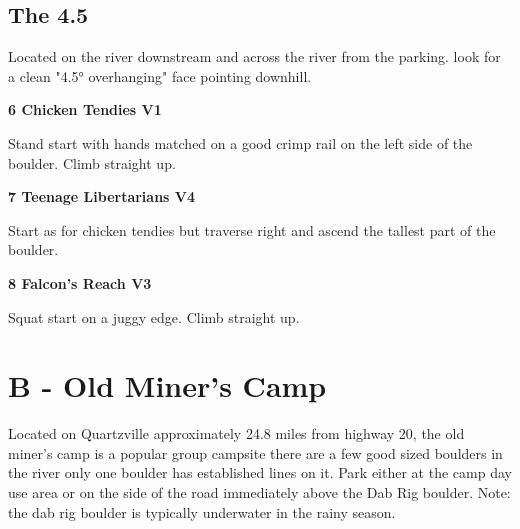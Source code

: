	\begin{multicols}{2}


\needspace{1.5cm}
\subsection*{The 4.5}\label{bf:The 4.5}
Located on the river downstream and across the river from the parking. look for a clean "4.5° overhanging" face pointing downhill.\\
	


\needspace{1.5cm}
\label{rt:Chicken Tendies}
\colorbox{green!20}{
\parbox{0.95\linewidth}{
\textbf{
6 Chicken Tendies V1  
}}}

\begin{adjustwidth}{0.5cm}{}			
Stand start with hands matched on a good crimp rail on the left side of the boulder. Climb straight up.
\end{adjustwidth}



\needspace{1.5cm}
\label{rt:Teenage Libertarians}
\colorbox{RoyalBlue!20}{
\parbox{0.95\linewidth}{
\textbf{
7 Teenage Libertarians V4  
}}}

\begin{adjustwidth}{0.5cm}{}			
Start as for chicken tendies but traverse right and ascend the tallest part of the boulder.
\end{adjustwidth}



\needspace{1.5cm}
\label{rt:Falcon's Reach}
\colorbox{green!20}{
\parbox{0.95\linewidth}{
\textbf{
8 Falcon's Reach V3  
}}}

\begin{adjustwidth}{0.5cm}{}			
Squat start on a juggy edge. Climb straight up.
\end{adjustwidth}




\newpage

\section{B - Old Miner's Camp}\label{sa:Old Miner's Camp}
Located on Quartzville approximately 24.8 miles from highway 20, the old miner's camp is a popular group campsite there are a few good sized boulders in the river only one boulder has established lines on it. Park either at the camp day use area or on the side of the road immediately above the Dab Rig boulder. Note: the dab rig boulder is typically underwater in the rainy season.\\





\end{multicols}
